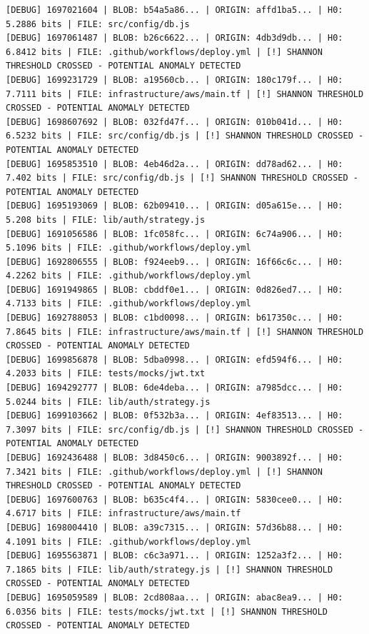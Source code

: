\documentclass[12pt, a4paper, oneside]{report}
\begin{document}
\newpage
\begin{lstlisting}[basicstyle=\tiny\ttfamily]
[DEBUG] 1697021604 | BLOB: b54a5a86... | ORIGIN: affd1ba5... | H0: 5.2886 bits | FILE: src/config/db.js
[DEBUG] 1697061487 | BLOB: b26c6622... | ORIGIN: 4db3d9db... | H0: 6.8412 bits | FILE: .github/workflows/deploy.yml | [!] SHANNON THRESHOLD CROSSED - POTENTIAL ANOMALY DETECTED
[DEBUG] 1699231729 | BLOB: a19560cb... | ORIGIN: 180c179f... | H0: 7.7111 bits | FILE: infrastructure/aws/main.tf | [!] SHANNON THRESHOLD CROSSED - POTENTIAL ANOMALY DETECTED
[DEBUG] 1698607692 | BLOB: 032fd47f... | ORIGIN: 010b041d... | H0: 6.5232 bits | FILE: src/config/db.js | [!] SHANNON THRESHOLD CROSSED - POTENTIAL ANOMALY DETECTED
[DEBUG] 1695853510 | BLOB: 4eb46d2a... | ORIGIN: dd78ad62... | H0: 7.402 bits | FILE: src/config/db.js | [!] SHANNON THRESHOLD CROSSED - POTENTIAL ANOMALY DETECTED
[DEBUG] 1695193069 | BLOB: 62b09410... | ORIGIN: d05a615e... | H0: 5.208 bits | FILE: lib/auth/strategy.js
[DEBUG] 1691056586 | BLOB: 1fc058fc... | ORIGIN: 6c74a906... | H0: 5.1096 bits | FILE: .github/workflows/deploy.yml
[DEBUG] 1692806555 | BLOB: f924eeb9... | ORIGIN: 16f66c6c... | H0: 4.2262 bits | FILE: .github/workflows/deploy.yml
[DEBUG] 1691949865 | BLOB: cbddf0e1... | ORIGIN: 0d826ed7... | H0: 4.7133 bits | FILE: .github/workflows/deploy.yml
[DEBUG] 1692788053 | BLOB: c1bd0098... | ORIGIN: b617350c... | H0: 7.8645 bits | FILE: infrastructure/aws/main.tf | [!] SHANNON THRESHOLD CROSSED - POTENTIAL ANOMALY DETECTED
[DEBUG] 1699856878 | BLOB: 5dba0998... | ORIGIN: efd594f6... | H0: 4.2033 bits | FILE: tests/mocks/jwt.txt
[DEBUG] 1694292777 | BLOB: 6de4deba... | ORIGIN: a7985dcc... | H0: 5.0244 bits | FILE: lib/auth/strategy.js
[DEBUG] 1699103662 | BLOB: 0f532b3a... | ORIGIN: 4ef83513... | H0: 7.3097 bits | FILE: src/config/db.js | [!] SHANNON THRESHOLD CROSSED - POTENTIAL ANOMALY DETECTED
[DEBUG] 1692436488 | BLOB: 3d8450c6... | ORIGIN: 9003892f... | H0: 7.3421 bits | FILE: .github/workflows/deploy.yml | [!] SHANNON THRESHOLD CROSSED - POTENTIAL ANOMALY DETECTED
[DEBUG] 1697600763 | BLOB: b635c4f4... | ORIGIN: 5830cee0... | H0: 4.6717 bits | FILE: infrastructure/aws/main.tf
[DEBUG] 1698004410 | BLOB: a39c7315... | ORIGIN: 57d36b88... | H0: 4.1091 bits | FILE: .github/workflows/deploy.yml
[DEBUG] 1695563871 | BLOB: c6c3a971... | ORIGIN: 1252a3f2... | H0: 7.1865 bits | FILE: lib/auth/strategy.js | [!] SHANNON THRESHOLD CROSSED - POTENTIAL ANOMALY DETECTED
[DEBUG] 1695059589 | BLOB: 2cd808aa... | ORIGIN: abac8ea9... | H0: 6.0356 bits | FILE: tests/mocks/jwt.txt | [!] SHANNON THRESHOLD CROSSED - POTENTIAL ANOMALY DETECTED

\end{lstlisting}
\end{document}
